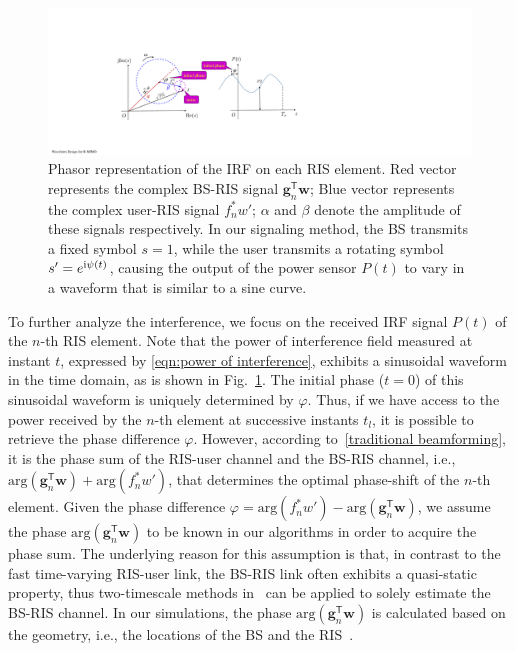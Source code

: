 \documentclass[journal,twocolumn]{IEEEtran}
\theoremstyle{nonumberplain}
\def \T {\bm \Theta}
\def \arg {\text{arg}}
\def \T {^{\mathsf{T}}}
\def \ri {{\rm i}}
\begin{document}
    \begin{figure}[!t]
        \centering
        \includegraphics[width=\linewidth]{figures/phasor.pdf}
        \caption{Phasor representation of the \ac{IRF} on each RIS element. Red vector represents the complex BS-RIS signal ${\bm g}_n\T{\bm w}$; Blue vector represents the complex user-RIS signal $f_n^*w'$; $\alpha$ and $\beta$ denote the amplitude of these signals respectively. In our signaling method, the BS transmits a fixed symbol $s=1$, while the user transmits a rotating symbol $s'=e^{\ri\psi(t)}$, causing the output of the power sensor $P(t)$ to vary in a waveform that is similar to a sine curve.}
        \label{fig:phasor}
    \end{figure}
    To further analyze the interference, we focus on the received IRF signal $P(t)$ of the $n$-th RIS element. 
    Note that the power of interference field measured at instant $t$, expressed by \eqref{eqn:power of interference}, exhibits a sinusoidal waveform in the time domain, as is shown in Fig.~\ref{fig:phasor}. 
    The initial phase ($t=0$) of this sinusoidal waveform is uniquely determined by $\varphi$.
    Thus, if we have access to the power received by the $n$-th element at successive instants $t_l$, it is possible to retrieve the phase difference $\varphi$. 
    However, according to~\eqref{traditional beamforming}, it is the phase sum of the RIS-user channel and the BS-RIS channel, i.e., $\arg({\bm g}_n\T{\bm w})+\arg(f_n^*w')$, that determines the optimal phase-shift of the $n$-th element. Given the phase difference $\varphi = \arg\left(f_{n}^{*}w'\right)-\arg\left(\bm g_{n}\T\bm w\right)$, we assume the phase $\arg({\bm g}_n\T{\bm w})$ to be known in our algorithms in order to acquire the phase sum.
    The underlying reason for this assumption is that, in contrast to the fast time-varying RIS-user link, the BS-RIS link often exhibits a quasi-static property, thus two-timescale methods in~\cite{Huchen} can be applied to solely estimate the BS-RIS channel.
    In our simulations, the phase $\arg({\bm g}_n\T{\bm w})$ is calculated based on the geometry, i.e., the locations of the BS and the RIS~\cite{bai2014coverage}. 
\end{document}
